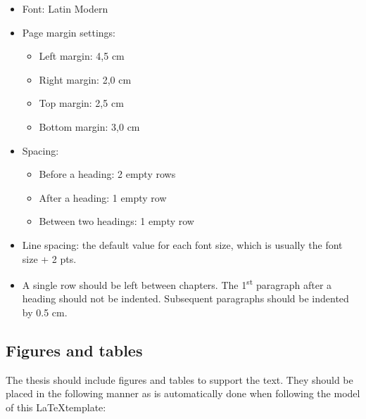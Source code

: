 \begin{itemize}
    \setlength\itemsep{0pt}
    \setlength\parskip{0pt}
    \item Font: Latin Modern
    \item Page margin settings:
    \begin{itemize}[wide=0pt]
        \setlength\itemsep{0pt}
        \setlength\parskip{0pt}
        \item Left margin: 4,5 cm
        \item Right margin: 2,0 cm
        \item Top margin: 2,5 cm
        \item Bottom margin: 3,0 cm
    \end{itemize}
    \item Spacing:
    \begin{itemize}[wide=0pt]
        \setlength\itemsep{0pt}
        \setlength\parskip{0pt}
        \item Before a heading: 2 empty rows
        \item After a heading: 1 empty row
        \item Between two headings: 1 empty row
    \end{itemize}

    \item Line spacing: the default value for each font size, which is usually the font size +
    2 pts.
    \item A single row should be left between chapters. The 1\textsuperscript{st} paragraph after a heading should not be indented. Subsequent paragraphs should be indented by 0.5 cm.
\end{itemize}

\subsection{Figures and tables}
The thesis should include figures and tables to support the text. They should be placed in the following manner as is automatically done when following the model of this \LaTeX template:

